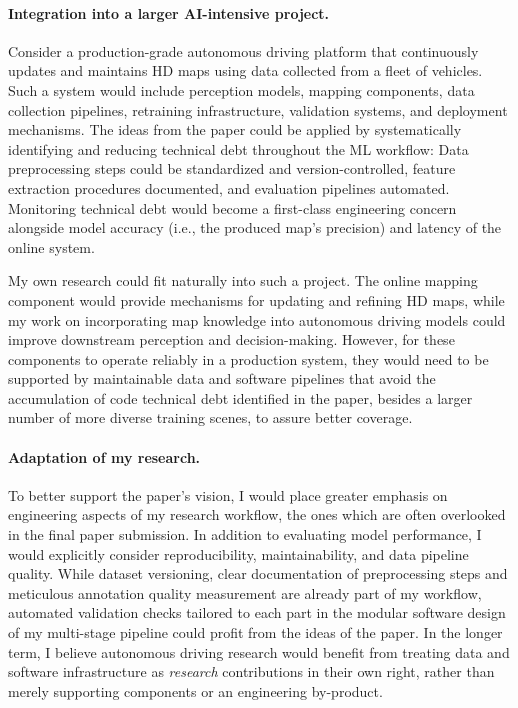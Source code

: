 \documentclass[11pt]{article}
\begin{document}
\paragraph{Integration into a larger AI-intensive project.} Consider a production-grade autonomous driving platform that continuously updates and maintains HD maps using data collected from a fleet of vehicles. Such a system would include perception models, mapping components, data collection pipelines, retraining infrastructure, validation systems, and deployment mechanisms. The ideas from the paper could be applied by systematically identifying and reducing technical debt throughout the ML workflow: Data preprocessing steps could be standardized and version-controlled, feature extraction procedures documented, and evaluation pipelines automated. Monitoring technical debt would become a first-class engineering concern alongside model accuracy (i.e., the produced map's precision) and latency of the online system.

My own research could fit naturally into such a project. The online mapping component would provide mechanisms for updating and refining HD maps, while my work on incorporating map knowledge into autonomous driving models could improve downstream perception and decision-making. However, for these components to operate reliably in a production system, they would need to be supported by maintainable data and software pipelines that avoid the accumulation of code technical debt identified in the paper, besides a larger number of more diverse training scenes, to assure better coverage.

\paragraph{Adaptation of my research.} To better support the paper's vision, I would place greater emphasis on engineering aspects of my research workflow, the ones which are often overlooked in the final paper submission. In addition to evaluating model performance, I would explicitly consider reproducibility, maintainability, and data pipeline quality. While dataset versioning, clear documentation of preprocessing steps and meticulous annotation quality measurement are already part of my workflow, automated validation checks tailored to each part in the modular software design of my multi-stage pipeline could profit from the ideas of the paper. 
In the longer term, I believe autonomous driving research would benefit from treating data and software infrastructure as \emph{research} contributions in their own right, rather than merely supporting components or an engineering by-product.
\end{document}
